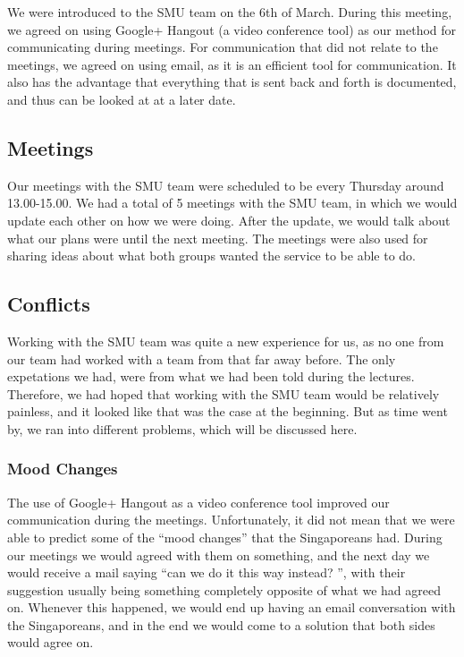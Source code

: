 We were introduced to the SMU team on the 6th of March. During this meeting, we agreed on using Google+ Hangout (a video conference tool) as our method for communicating during meetings. For communication that did not relate to the meetings, we agreed on using email, as it is an efficient tool for communication. It also has the advantage that everything that is sent back and forth is documented, and thus can be looked at at a later date.

\subsection{Meetings}
\label{Collaboration_SMU_Meetings}
Our meetings with the SMU team were scheduled to be every Thursday around 13.00-15.00. We had a total of 5 meetings with the SMU team, in which we would update each other on how we were doing. After the update, we would talk about what our plans were until the next meeting. The meetings were also used for sharing ideas about what both groups wanted the service to be able to do.

\subsection{Conflicts}
\label{Collaboration_SMU_Conflicts}
Working with the SMU team was quite a new experience for us, as no one from our team had worked with a team from that far away before. The only expetations we had, were from what we had been told during the lectures. Therefore, we had hoped that working with the SMU team would be relatively painless, and it looked like that was the case at the beginning. But as time went by, we ran into different problems, which will be discussed here.

\subsubsection{Mood Changes}
\label{Collaboration_SMU_ConflictsMood}
The use of Google+ Hangout as a video conference tool improved our communication during the meetings. Unfortunately, it did not mean that we were able to predict some of the ``mood changes'' that the Singaporeans had. During our meetings we would agreed with them on something, and the next day we would receive a mail saying ``can we do it this way instead? '', with their suggestion usually being something completely opposite of what we had agreed on. Whenever this happened, we would end up having an email conversation with the Singaporeans, and in the end we would come to a solution that both sides would agree on.

